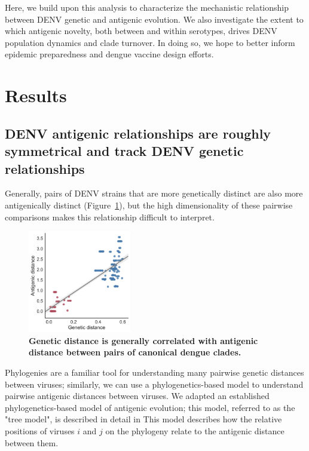 \documentclass[11pt,oneside,letterpaper]{article}
\begin{document}
Here, we build upon this analysis to characterize the mechanistic relationship between DENV genetic and antigenic evolution.
We also investigate the extent to which antigenic novelty, both between and within serotypes, drives DENV population dynamics and clade turnover.
In doing so, we hope to better inform epidemic preparedness and dengue vaccine design efforts.



\section*{Results}
\subsection*{DENV antigenic relationships are roughly symmetrical and track DENV genetic relationships}
Generally, pairs of DENV strains that are more genetically distinct are also more antigenically distinct  (Figure~\ref{genetic_antigenic_distance}), but the high dimensionality of these pairwise comparisons makes this relationship difficult to interpret.
\begin{figure}[h]
 \centering
	\includegraphics[width=0.40\textwidth]{figs/genetic_antigenic_distance.png}
	\caption{\textbf{
Genetic distance is generally correlated with antigenic distance between pairs of canonical dengue clades.
  }}
	\label{genetic_antigenic_distance}
\end{figure}
Phylogenies are a familiar tool for understanding many pairwise genetic distances between viruses; similarly, we can use a phylogenetics-based model to understand pairwise antigenic distances between viruses.
We adapted an established phylogenetics-based model of antigenic evolution; this model, referred to as the "tree model", is described in detail in %
This model describes how the relative positions of viruses $i$ and $j$ on the phylogeny relate to the antigenic distance between them.
\end{document}
